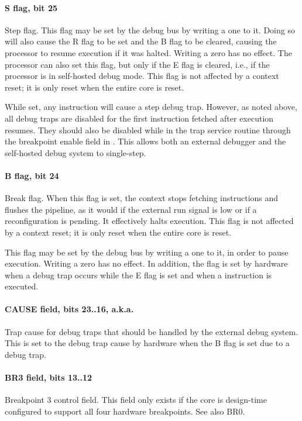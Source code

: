 \paragraph*{S flag, bit 25}
Step flag. This flag may be set by the debug bus by writing a one to it. Doing
so will also cause the R flag to be set and the B flag to be cleared, causing
the processor to resume execution if it was halted. Writing a zero has no
effect. The processor can also set this flag, but only if the E flag is cleared,
i.e., if the processor is in self-hosted debug mode. This flag is not affected
by a context reset; it is only reset when the entire core is reset.

While set, any instruction will cause a step debug trap. However, as noted
above, all debug traps are disabled for the first instruction fetched after
execution resumes. They should also be disabled while in the trap service
routine through the breakpoint enable field in . This allows both an
external debugger and the self-hosted debug system to single-step.
\paragraph*{B flag, bit 24}
Break flag. When this flag is set, the context stops fetching instructions and
flushes the pipeline, as it would if the external run signal is low or if a
reconfiguration is pending. It effectively halts execution. This flag is not
affected by a context reset; it is only reset when the entire core is reset.

This flag may be set by the debug bus by writing a one to it, in order to pause
execution. Writing a zero has no effect. In addition, the flag is set by
hardware when a debug trap occurs while the E flag is set and when a 
instruction is executed.
\paragraph*{CAUSE field, bits 23..16, a.k.a. }
\label{reg:DCRC}
Trap cause for debug traps that should be handled by the external debug system.
This is set to the debug trap cause by hardware when the B flag is set due to a
debug trap.
\paragraph*{BR3 field, bits 13..12}
Breakpoint 3 control field. This field only exists if the core is design-time
configured to support all four hardware breakpoints. See also BR0.
